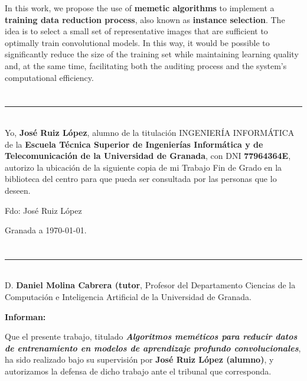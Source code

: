 In this work, we propose the use of \textbf{memetic algorithms} to implement a \textbf{training data reduction process},
also known as \textbf{instance selection}.
The idea is to select a small set of representative images that are sufficient to optimally train convolutional models.
In this way, it would be possible to significantly reduce the size of the training set while maintaining learning quality and,
at the same time, facilitating both the auditing process and the system's computational efficiency.

\chapter*{}
\thispagestyle{empty}

\noindent\rule[-1ex]{\textwidth}{2pt}\\[4.5ex]

Yo, \textbf{José Ruiz López}, alumno de la titulación INGENIERÍA INFORMÁTICA de la \textbf{Escuela Técnica Superior
       de Ingenierías Informática y de Telecomunicación de la Universidad de Granada}, con DNI \textbf{77964364E}, autorizo la
ubicación de la siguiente copia de mi Trabajo Fin de Grado en la biblioteca del centro para que pueda ser
consultada por las personas que lo deseen.

\vspace{6cm}

\noindent Fdo: José Ruiz López

\vspace{2cm}

\begin{flushright}
       Granada a \today.
\end{flushright}


\chapter*{}
\thispagestyle{empty}

\noindent\rule[-1ex]{\textwidth}{2pt}\\[4.5ex]

D. \textbf{Daniel Molina Cabrera (tutor}, Profesor del Departamento Ciencias de la Computación e Inteligencia
Artificial de la Universidad de Granada.

\vspace{0.5cm}

\textbf{Informan:}

\vspace{0.5cm}

Que el presente trabajo, titulado \textit{\textbf{Algoritmos meméticos para reducir datos de entrenamiento en modelos de aprendizaje profundo convolucionales}},
ha sido realizado bajo su supervisión por \textbf{José Ruiz López (alumno)}, y autorizamos la defensa de dicho trabajo  ante el tribunal que corresponda.

